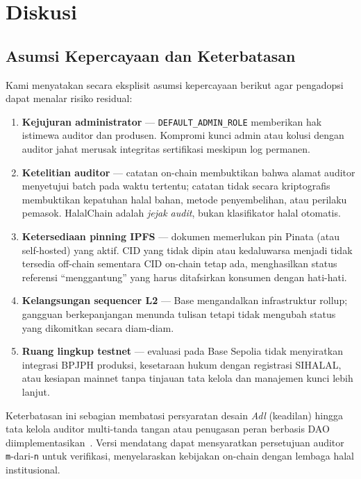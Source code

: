 \section{Diskusi}
\label{sec:discussion}

\subsection{Asumsi Kepercayaan dan Keterbatasan}
Kami menyatakan secara eksplisit asumsi kepercayaan berikut agar pengadopsi dapat menalar risiko residual:

\begin{enumerate}
  \item \textbf{Kejujuran administrator} --- \texttt{DEFAULT\_ADMIN\_ROLE} memberikan hak istimewa auditor dan produsen.
  Kompromi kunci admin atau kolusi dengan auditor jahat merusak integritas sertifikasi meskipun log permanen.
  \item \textbf{Ketelitian auditor} --- catatan on-chain membuktikan bahwa alamat auditor menyetujui batch pada waktu tertentu; catatan tidak secara kriptografis membuktikan kepatuhan halal bahan, metode penyembelihan, atau perilaku pemasok.
  HalalChain adalah \emph{jejak audit}, bukan klasifikator halal otomatis.
  \item \textbf{Ketersediaan pinning IPFS} --- dokumen memerlukan pin Pinata (atau self-hosted) yang aktif.
  CID yang tidak dipin atau kedaluwarsa menjadi tidak tersedia off-chain sementara CID on-chain tetap ada, menghasilkan status referensi ``menggantung'' yang harus ditafsirkan konsumen dengan hati-hati.
  \item \textbf{Kelangsungan sequencer L2} --- Base mengandalkan infrastruktur rollup; gangguan berkepanjangan menunda tulisan tetapi tidak mengubah status yang dikomitkan secara diam-diam.
  \item \textbf{Ruang lingkup testnet} --- evaluasi pada Base Sepolia tidak menyiratkan integrasi BPJPH produksi, kesetaraan hukum dengan registrasi SIHALAL, atau kesiapan mainnet tanpa tinjauan tata kelola dan manajemen kunci lebih lanjut.
\end{enumerate}

Keterbatasan ini sebagian membatasi persyaratan desain \emph{Adl} (keadilan) hingga tata kelola auditor multi-tanda tangan atau penugasan peran berbasis DAO diimplementasikan~\cite{gnosis2024safe}.
Versi mendatang dapat mensyaratkan persetujuan auditor \texttt{m}-dari-\texttt{n} untuk verifikasi, menyelaraskan kebijakan on-chain dengan lembaga halal institusional.

